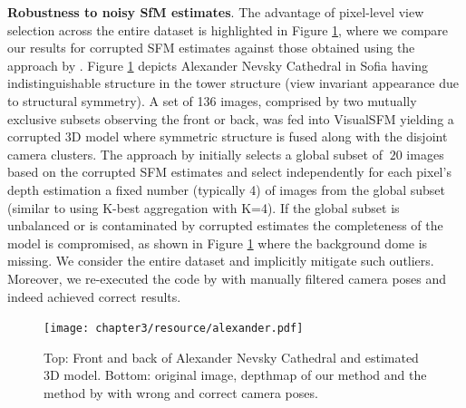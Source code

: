 {\bf Robustness to noisy SfM estimates}. The  advantage of  pixel-level view selection across the entire dataset is highlighted  in Figure \ref{fig:alexander}, where we compare  our results for corrupted SFM estimates  against those obtained using the approach by \citet{Goesele07}.
Figure \ref{fig:alexander} depicts Alexander Nevsky Cathedral in Sofia having indistinguishable structure in the tower structure (\ie view invariant appearance due to structural symmetry). A set of 136 images, comprised by two mutually exclusive subsets observing the front or back, was fed into VisualSFM \cite{WuVSFM} yielding a corrupted 3D model where symmetric structure is fused along with the disjoint camera clusters. The approach by \citet{Goesele07} initially selects a global subset of $~20$ images based  on the corrupted SFM estimates and select  independently for each pixel's depth estimation a fixed number (typically 4) of images from the global subset (similar to using K-best aggregation with K=4). If the global subset is unbalanced or is contaminated by corrupted estimates the completeness of the model is compromised, as shown in Figure \ref{fig:alexander} where the background dome is missing. We consider the entire dataset and implicitly mitigate such outliers. Moreover, we re-executed the code by \citet{Goesele07} with manually filtered camera poses and indeed achieved correct results.

\begin{figure}
\centering
\texttt{[image: chapter3/resource/alexander.pdf]}
\caption[Example depthmap output given outlier camera poses.]{\label{fig:alexander} Top: Front and back of Alexander Nevsky Cathedral and estimated 3D model. Bottom: original image, depthmap of our method and the method by \citet{Goesele07} with wrong and correct camera poses.
}
\end{figure}

